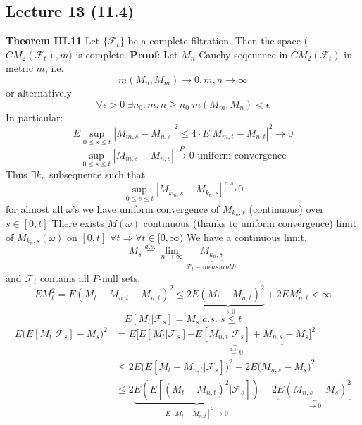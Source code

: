 \documentclass[english]{article}
\newcommand{\ub}{\underbrace}
\newcommand{\note}[1]{\noindent\textbf{#1}}
\newcommand{\F}{\mathcal F}
\newcommand{\as}[1]{\stackrel {a.s.}{#1}}
\begin{document}
\subsection*{Lecture 13 (11.4)}
\note{Theorem III.11} Let $\{\F_t\}$ be a complete filtration. Then the space ($CM_2(\F_t), m)$ is complete. \newline
\note{Proof}: Let $M_n$ Cauchy seqeuence in $CM_2(\F_t)$ in metric $m$, i.e.	$$m(M_n, M_m) \to 0, m,n\to \infty$$
or alternatively
$$\forall \epsilon >0 \; \exists n_0: m,n\geq n_0 \; m(M_m, M_n) < \epsilon$$
In particular: 
$$E\sup_{0\leq s \leq t} |M_{m,s} - M_{n,s}|^2 \leq 4\cdot E|M_{m,t} - M_{n,t}|^2 \to 0$$
$$\sup_{0\leq s \leq t} |M_{m,s} - M_{n,s}| \stackrel{P}\to 0 \text{ uniform convergence}$$
Thus $\exists k_n$ subsequence such that
$$\sup_{0\leq s \leq t} |M_{k_m,s} - M_{k_n, s}| \stackrel{a.s.} \to 0$$
for almost all $\omega$'s  we have uniform convergence of $M_{k_n,s}$ (continuous) over $s\in [0,t]$ \newline
There exists $M(\omega)$ continuous (thanks to uniform convergence) limit of $M_{k_n, s}(\omega)$ on $[0,t]$ $\forall t \Rightarrow \forall t \in [0,\infty)$ \newline
We have a continuous limit. 
$$M_s \as = \lim_{n\to \infty} \ub{M_{k_n, s}}_{\F_t-measurable}$$
and $\F_t$ contains all $P$-null sets. 
$$EM_t^2 = E(M_t - M_{n,t} + M_{n,t})^2 \leq 2 \ub{E(M_t - M_{n,t})^2}_{\to 0} + 2 EM^2_{n,t} < \infty$$
$$E[M_t |\F_s] = M_s \; a.s. \; s\leq t$$
\begin{align*}
E\Big( E[M_t | \F_s] - M_s \Big)^2 &= E \Big[ E[M_t |\F_s] \ub{- E[M_{n,t} |\F_s ] + M_{n,s}}_{\as = 0} - M_s \Big]^2 \\
&\leq 2 E\Big( E[M_t - M_{n,t}| \F_s] \Big)^2 + 2E(M_{n,s} - M_s\Big)^2  \\
&\leq 2\ub{E ( E[(M_t - M_{n,t})^2 |\F_s])}_{E[M_t - M_{n,t}]^2 \to 0} + 2\ub{E(M_{n,s} - M_s)^2}_{\to 0}
\end{align*}
\end{document}
